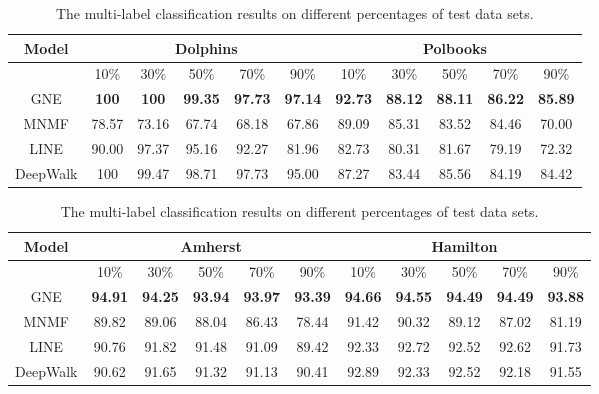 \documentclass{article}
\theoremstyle{definition}
\begin{document}
	

	\begin{table}[!h]
	  \centering
	  \begin{tabular}{|c|c|c|c|c|c||c|c|c|c|c|}
	   \hline
	   Model& 
	   \multicolumn{5}{c||}{Dolphins} & 
	   \multicolumn{5}{c|}{Polbooks} \\
	   \hline
	   &
	   10\% & 30\% & 50\% & 70\% & 90\% &
	   10\% & 30\% & 50\% & 70\% & 90\%
	   \\
	   \hline
	   GNE & 
	   \textbf{100} & \textbf{100} & \textbf{99.35} & \textbf{97.73} & \textbf{97.14} &
	   \textbf{92.73} & \textbf{88.12} & \textbf{88.11} & \textbf{86.22} &  \textbf{85.89}
	   \\
	   MNMF &
	   78.57 & 73.16 & 67.74 & 68.18 & 67.86 &
	   89.09 & 85.31 & 83.52 & 84.46 & 70.00 
	   \\
	   LINE & 
	   90.00 & 97.37 & 95.16 & 92.27 & 81.96 &
	   82.73 & 80.31 & 81.67 & 79.19 & 72.32
	   \\
	   DeepWalk & 
	   100 & 99.47 & 98.71 & 97.73 & 95.00 &
	   87.27 & 83.44 & 85.56 & 84.19 & 84.42
	   \\
	   \hline
	  \end{tabular}

	  \begin{tabular}{|c|c|c|c|c|c||c|c|c|c|c|}
	   \hline
	   Model& 
	   \multicolumn{5}{c||}{Amherst} & 
	   \multicolumn{5}{c|}{Hamilton} \\
	   \hline
	   &
	   10\% & 30\% & 50\% & 70\% & 90\% &
	   10\% & 30\% & 50\% & 70\% & 90\%
	   \\
	   \hline
	   GNE & 
	   \textbf{94.91} & \textbf{94.25}  &  \textbf{93.94} & \textbf{93.97} & \textbf{93.39} &
	   \textbf{94.66} & \textbf{94.55}  &  \textbf{94.49}  &   \textbf{94.49}  &  \textbf{93.88}
	   \\
	   MNMF &
	   89.82 &  89.06 & 88.04 & 86.43 & 78.44 &
	   91.42 & 90.32 & 89.12 & 87.02 & 81.19
	   \\
	   LINE & 
	   90.76 & 91.82 & 91.48 & 91.09 & 89.42 &
	   92.33 & 92.72 & 92.52 & 92.62 & 91.73
	   \\
	   DeepWalk & 
	   90.62 & 91.65 & 91.32 & 91.13 & 90.41 &
	   92.89 & 92.33 & 92.52 & 92.18 & 91.55
	   \\
	   \hline
	  \end{tabular}

	  \caption{The multi-label classification results on different percentages of test data sets.}
	  \label{tab:classification}
 \end{table} 
\end{document}
